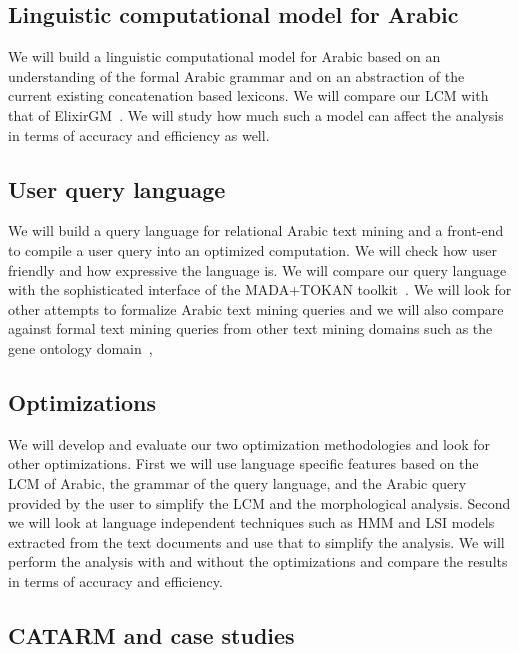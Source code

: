 \documentclass[12pt]{article}
\begin{document}
\subsection{Linguistic computational model for Arabic}

We will build a linguistic computational model for Arabic 
based on an understanding of the formal Arabic grammar 
and on an abstraction of the current existing concatenation
based lexicons.
We will compare our LCM with that of ElixirGM~\cite{Otakar:07}.
We will study how much such a model can affect the analysis
in terms of accuracy and efficiency as well. 

\subsection{User query language}

We will build a query language for relational Arabic text mining 
and a front-end to compile a user query into an optimized
computation. 
We will check how user friendly and how expressive the language is.
We will compare our query language with the sophisticated 
interface of the MADA+TOKAN toolkit~\cite{Habash:09}.
We will look for other attempts to formalize Arabic text 
mining queries and we will also compare against 
formal text mining queries from other text mining domains such
as the gene ontology domain~\cite{GeneOntology10},

\subsection{Optimizations}

We will develop and evaluate our two optimization methodologies
and look for other optimizations. 
First we will use language specific features based on the 
LCM of Arabic, the grammar of the query language, and 
the Arabic query provided by the user to simplify 
the LCM and the morphological analysis. 
Second we will look at language independent techniques
such as HMM and LSI models extracted from the 
text documents and use that to simplify the analysis. 
We will perform the analysis with and without the optimizations
and compare the results in terms of accuracy and efficiency. 

\subsection{CATARM and case studies }
\end{document}
